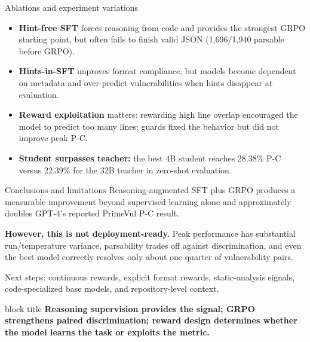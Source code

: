 \documentclass[final]{beamer}
\begin{document}
\begin{frame}[t]
\begin{center}
\begin{minipage}[t]{0.306\textwidth}
\begin{posterblock}{Ablations and experiment variations}
\begin{itemize}
  \item \textbf{Hint-free SFT} forces reasoning from code and provides the strongest GRPO starting point, but often fails to finish valid JSON (1,696/1,940 parsable before GRPO).
  \item \textbf{Hints-in-SFT} improves format compliance, but models become dependent on metadata and over-predict vulnerabilities when hints disappear at evaluation.
  \item \textbf{Reward exploitation} matters: rewarding high line overlap encouraged the model to predict too many lines; guards fixed the behavior but did not improve peak P-C.
  \item \textbf{Student surpasses teacher:} the best 4B student reaches 28.38\% P-C versus 22.39\% for the 32B teacher in zero-shot evaluation.
\end{itemize}
\end{posterblock}

\begin{posterblock}{Conclusions and limitations}
Reasoning-augmented SFT plus GRPO produces a measurable improvement beyond supervised learning alone and approximately doubles GPT-4's reported PrimeVul P-C result.

\vspace{0.35em}
\textbf{However, this is not deployment-ready.} Peak performance has substantial run/temperature variance, parsability trades off against discrimination, and even the best model correctly resolves only about one quarter of vulnerability pairs.

\vspace{0.35em}
Next steps: continuous rewards, explicit format rewards, static-analysis signals, code-specialized base models, and repository-level context.
\end{posterblock}
\end{minipage}
\end{center}

\vfill
\begin{beamercolorbox}[wd=\paperwidth,sep=0.8cm,leftskip=1.5cm,rightskip=1.5cm]{block title}
{\centering\fontsize{24}{29}\selectfont\bfseries
Reasoning supervision provides the signal; GRPO strengthens paired discrimination; reward design determines whether the model learns the task or exploits the metric.}
\end{beamercolorbox}

\end{frame}
\end{document}
